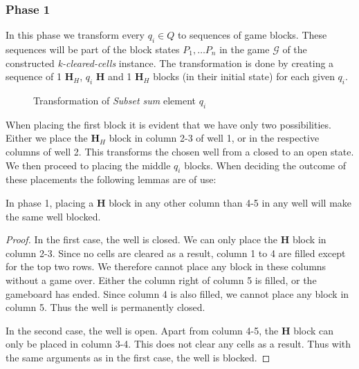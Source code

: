 \subsubsection{Phase 1}
\label{subsub:phaseone}
In this phase we transform every $q_i \in Q$ to sequences of game blocks. These sequences will be part of the block states $P_1, \ldots P_n$ in the game $\mathcal{G}$ of the constructed \textit{k-cleared-cells} instance. The transformation is done by creating a sequence of 1 $\mathbf{H}_{H}$, $q_i$ $\mathbf{H}$ and 1 $\mathbf{H}_H$ blocks (in their initial state) for each given $q_i$.

\begin{figure}[H]
    \centering
    \caption{Transformation of \textit{Subset sum} element $q_i$}
    \label{fig:wells}
\end{figure}

When placing the first block it is evident that we have only two possibilities. Either we place the $\mathbf{H}_H$ block in column 2-3 of  well 1, or in the respective columns of well 2. This transforms the chosen well from a closed to an open state. We then proceed to placing the middle $q_i$ blocks. When deciding the outcome of these placements the following lemmas are of use:\\

\begin{lem}
\label{lem:permclose}
In phase 1, placing a $\mathbf{H}$ block in any other column than 4-5 in any well will make the same well blocked.
\end{lem}

\begin{proof}
In the first case, the well is closed. We can only place the $\mathbf{H}$ block in column 2-3. Since no cells are cleared as a result, column 1 to 4 are filled except for the top two rows. We therefore cannot place any block in these columns without a game over. Either the column right of column 5 is filled, or the gameboard has ended. Since column 4 is also filled, we cannot place any block in column 5. Thus the well is permanently closed.

In the second case, the well is open. Apart from column 4-5, the $\mathbf{H}$ block can only be placed in column 3-4. This does not clear any cells as a result. Thus with the same arguments as in the first case, the well is blocked.
\end{proof}

